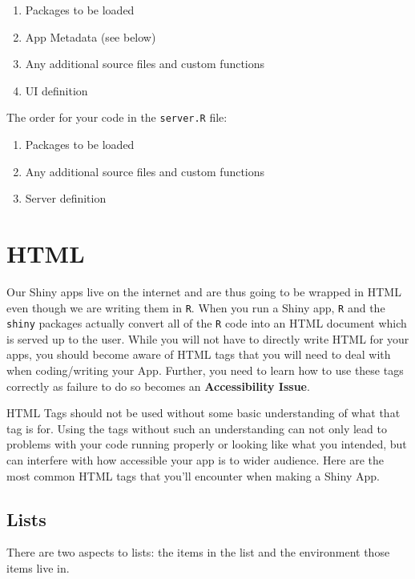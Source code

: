\documentclass[
]{book}
\providecommand{\tightlist}{%
  \setlength{\itemsep}{0pt}\setlength{\parskip}{0pt}}
\begin{document}
\begin{enumerate}
\def\labelenumi{\arabic{enumi}.}
\tightlist
\item
  Packages to be loaded
\item
  App Metadata (see below)
\item
  Any additional source files and custom functions
\item
  UI definition
\end{enumerate}

The order for your code in the \texttt{server.R} file:

\begin{enumerate}
\def\labelenumi{\arabic{enumi}.}
\tightlist
\item
  Packages to be loaded
\item
  Any additional source files and custom functions
\item
  Server definition
\end{enumerate}

\hypertarget{html}{%
\section{HTML}\label{html}}

Our Shiny apps live on the internet and are thus going to be wrapped in HTML even though we are writing them in \texttt{R}. When you run a Shiny app, \texttt{R} and the \texttt{shiny} packages actually convert all of the \texttt{R} code into an HTML document which is served up to the user. While you will not have to directly write HTML for your apps, you should become aware of HTML tags that you will need to deal with when coding/writing your App. Further, you need to learn how to use these tags correctly as failure to do so becomes an \textbf{Accessibility Issue}.

HTML Tags should not be used without some basic understanding of what that tag is for. Using the tags without such an understanding can not only lead to problems with your code running properly or looking like what you intended, but can interfere with how accessible your app is to wider audience. Here are the most common HTML tags that you'll encounter when making a Shiny App.

\hypertarget{lists}{%
\subsection{Lists}\label{lists}}

There are two aspects to lists: the items in the list and the environment those items live in.
\end{document}
